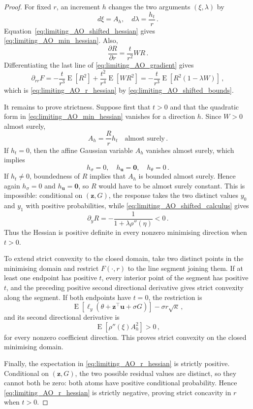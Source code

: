 \documentclass{article}
\DeclareMathOperator{\expect}{E}
\theoremstyle{definition}
\newcommand*{\bb}{\boldsymbol}
\def\bu{\bb{u}}
\def\bz{\bb{z}}
\begin{document}
\begin{bibunit}
\begin{proof}
For fixed $r$, an increment $h$ changes the two arguments
$(\xi,\lambda)$ by
$$
    d\xi=A_h,
    \quad
    d\lambda=\frac{h_t}{r}\,.
$$
Equation~\eqref{eq:limiting_AO_shifted_hessian} gives
\eqref{eq:limiting_AO_min_hessian}. Also,
$$
    \frac{\partial R}{\partial r}
    =
    \frac{t}{r^2}WR\,.
$$
Differentiating the last line of
\eqref{eq:limiting_AO_gradient} gives
$$
	\partial_{rr}F =-\frac{t}{r^3}\expect[R^2] +\frac{t^2}{r^4}\expect[WR^2] =-\frac{t}{r^3} \expect\left[R^2(1-\lambda W)\right]\,,
$$
which is \eqref{eq:limiting_AO_r_hessian} by
\eqref{eq:limiting_AO_shifted_bounds}.

It remains to prove strictness. Suppose first that $t>0$ and that the
quadratic form in \eqref{eq:limiting_AO_min_hessian} vanishes for a
direction $h$. Since $W>0$ almost surely,
$$
    A_h=\frac{R}{r}h_t
    \quad\text{almost surely}\,.
$$
If $h_t=0$, then the affine Gaussian variable $A_h$ vanishes almost
surely, which implies
$$
    h_\sigma=0,
    \quad
    h_{\bu}=\bb0,
    \quad
    h_\theta=0\,.
$$
If $h_t\neq0$, boundedness of $R$ implies that $A_h$ is bounded almost
surely. Hence again $h_\sigma=0$ and $h_{\bu}=\bb0$, so $R$ would have
to be almost surely constant. This is impossible: conditional on
$(\bz,G)$, the response takes the two distinct values $y_0$ and $y_1$
with positive probabilities, while
\eqref{eq:limiting_AO_shifted_calculus} gives
$$
    \partial_yR
    =
    -\frac{1}{1+\lambda\rho''(\eta)}
    <
    0\,.
$$
Thus the Hessian is positive definite in every nonzero minimising
direction when $t>0$.

To extend strict convexity to the closed domain, take two distinct points
in the minimising domain and restrict $F(\cdot,r)$ to the line segment
joining them. If at least one endpoint has positive $t$, every interior
point of the segment has positive $t$, and the preceding positive second
directional derivative gives strict convexity along the segment. If both
endpoints have $t=0$, the restriction is
$$
    \expect[\ell_y(\theta+\bz^\top\bu+\sigma G)]
    -\sigma r\sqrt\kappa\,,
$$
and its second directional derivative is
$$
    \expect[\rho''(\xi)A_h^2]>0\,,
$$
for every nonzero coefficient direction. This proves strict convexity on
the closed minimising domain.

Finally, the expectation in \eqref{eq:limiting_AO_r_hessian} is strictly
positive. Conditional on $(\bz,G)$, the two possible residual values are
distinct, so they cannot both be zero: both atoms have positive
conditional probability. Hence \eqref{eq:limiting_AO_r_hessian} is
strictly negative, proving strict concavity in $r$ when $t>0$.
\end{proof}


\end{bibunit}
\end{document}
